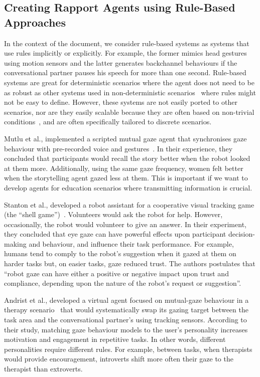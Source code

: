 \subsection{Creating Rapport Agents using Rule-Based Approaches}
\label{sub:sec:rulebasedAgents}

In the context of the document, we consider rule-based systems as systems that use rules implicitly or explicitly. For example, the former mimics head gestures using motion sensors and the latter generates backchannel behaviours if the conversational partner pauses his speech for more than one second. Rule-based systems are great for deterministic scenarios where the agent does not need to be as robust as other systems used in non-deterministic scenarios~\cite{Mutlu2006} where rules might not be easy to define. However, these systems are not easily ported to other scenarios, nor are they easily scalable because they are often based on non-trivial conditions~\cite{Kok2012}, and are often specifically tailored to discrete scenarios.

Mutlu et al., implemented a scripted mutual gaze agent that synchronises gaze behaviour with pre-recorded voice and gestures~\cite{Mutlu2006}. In their experience, they concluded that participants would recall the story better when the robot looked at them more. Additionally, using the same gaze frequency, women felt better when the storytelling agent gazed less at them. This is important if we want to develop agents for education scenarios where transmitting information is crucial.

Stanton et al., developed a robot assistant for a cooperative visual tracking game (the ``shell game'')~\cite{Stanton2014}. Volunteers would ask the robot for help. However, occasionally, the robot would volunteer to give an answer. In their experiment, they concluded that eye gaze can have powerful effects upon participant decision-making and behaviour, and influence their task performance. For example, humans tend to comply to the robot's suggestion when it gazed at them on harder tasks but, on easier tasks, gaze reduced trust. The authors postulates that ``robot gaze can have either a positive or negative impact upon trust and compliance, depending upon the nature of the robot’s request or suggestion''.

Andrist et al., developed a virtual agent focused on mutual-gaze behaviour in a therapy scenario~\cite{Andrist2015} that would systematically swap its gazing target between the task area and the conversational partner's using tracking sensors. According to their study, matching gaze behaviour models to the user's personality increases motivation and engagement in repetitive tasks. In other words, different personalities require different rules. For example, between tasks, when therapists would provide encouragement, introverts shift more often their gaze to the therapist than extroverts.

